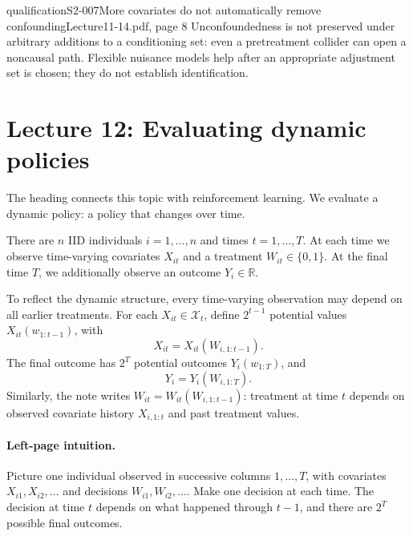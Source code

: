 \begin{reviewnote}{qualification}{S2-007}{More covariates do not automatically remove confounding}{Lecture11-14.pdf, page 8}
Unconfoundedness is not preserved under arbitrary additions to a conditioning set: even a pretreatment collider can open a noncausal path. Flexible nuisance models help after an appropriate adjustment set is chosen; they do not establish identification.
\end{reviewnote}


\section{Lecture 12: Evaluating dynamic policies}
The heading connects this topic with reinforcement learning. We evaluate a dynamic policy: a policy that changes over time.

There are $n$ IID individuals $i=1,\ldots,n$ and times $t=1,\ldots,T$. At each time we observe time-varying covariates $X_{it}$ and a treatment $W_{it}\in\{0,1\}$. At the final time $T$, we additionally observe an outcome $Y_i\in\mathbb R$.

To reflect the dynamic structure, every time-varying observation may depend on all earlier treatments. For each $X_{it}\in\mathcal X_t$, define $2^{t-1}$ potential values $X_{it}(w_{1:t-1})$, with
\[
 X_{it}=X_{it}(W_{i,1:t-1}).
\]
The final outcome has $2^T$ potential outcomes $Y_i(w_{1:T})$, and
\[
 Y_i=Y_i(W_{i,1:T}).
\]
Similarly, the note writes $W_{it}=W_{it}(W_{i,1:t-1})$: treatment at time $t$ depends on observed covariate history $X_{i,1:t}$ and past treatment values.

\paragraph{Left-page intuition.}
Picture one individual observed in successive columns $1,\ldots,T$, with covariates $X_{i1},X_{i2},\ldots$ and decisions $W_{i1},W_{i2},\ldots$. Make one decision at each time. The decision at time $t$ depends on what happened through $t-1$, and there are $2^T$ possible final outcomes.

